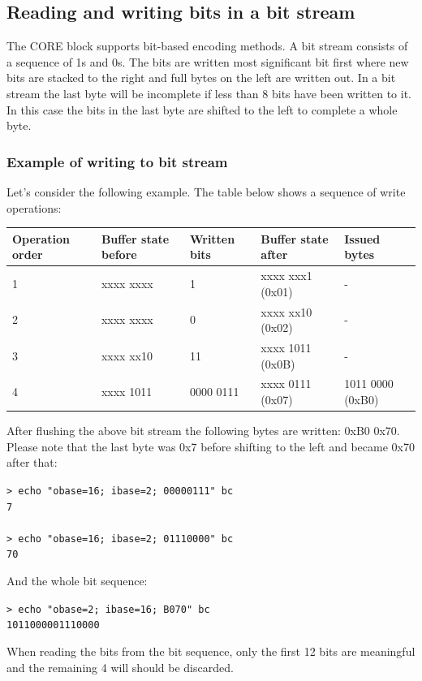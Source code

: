 \documentclass[a4paper]{article}
\begin{document}
\subsection{\textbf{Reading and writing bits in a bit stream}}

The CORE block supports bit-based encoding methods.
A bit stream consists of a sequence of 1s and 0s.
The bits are written most significant bit first where new bits are stacked to the right and full bytes on the left are written out.
In a bit stream the last byte will be incomplete if less than 8 bits have been written to it.
In this case the bits in the last byte are shifted to the left to complete a whole byte.

\subsubsection*{Example of writing to bit stream}

Let's consider the following example. The table below shows a sequence of write 
operations: 

\begin{tabular}{|l|l|l|l|l|}
\hline
\textbf{Operation order} & \textbf{Buffer state before} & \textbf{Written bits} & \textbf{Buffer state after} & \textbf{Issued bytes}\tabularnewline
\hline
1 & xxxx xxxx & 1 & xxxx xxx1 (0x01) & -\tabularnewline
\hline
2 & xxxx xxxx & 0 & xxxx xx10 (0x02) & -\tabularnewline
\hline
3 & xxxx xx10 & 11 & xxxx 1011 (0x0B) & -\tabularnewline
\hline
4 & xxxx 1011 & 0000 0111 & xxxx 0111 (0x07) & 1011 0000 (0xB0)\tabularnewline
\hline
\end{tabular}

After flushing the above bit stream the following bytes are written: 0xB0 0x70. 
Please note that the last byte was 0x7 before shifting to the left and became 0x70 
after that:

\texttt{> echo "obase=16; ibase=2; 00000111" \textbar{} bc\\
7\\
\\
> echo "obase=16; ibase=2; 01110000" \textbar{} bc\\
70}

And the whole bit sequence: 

\texttt{> echo "obase=2; ibase=16; B070" \textbar{} bc\\
1011000001110000}

When reading the bits from the bit sequence, only the first 12 bits are meaningful and the remaining 4 will should be discarded.
\end{document}

